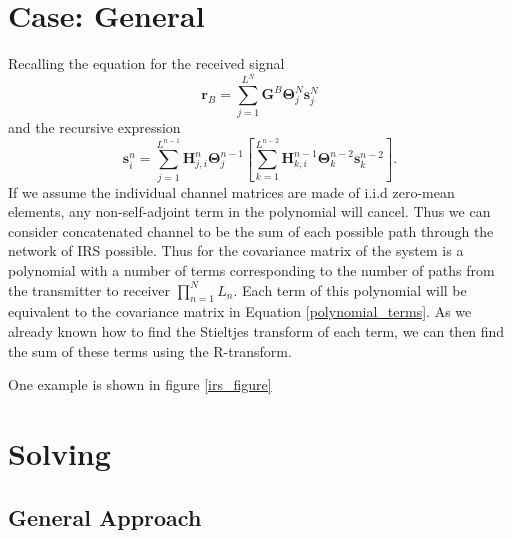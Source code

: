 \documentclass[12pt,a4paper]{report}
\begin{document}
\section{Case: General} 
Recalling the equation for the received signal
	\begin{equation*}
\mathbf{r}_{B} = \sum_{j = 1}^{L^{N}}\mathbf{G}^{B}\boldsymbol{\Theta}^{N}_{j}\mathbf{s}^{N}_{j}
\end{equation*}
and the recursive expression 
\begin{equation*}
\mathbf{s}^{n}_{i} = \sum_{j = 1}^{L^{n-1}}  \mathbf{H}^{n}_{j,i}\boldsymbol{\Theta}^{n-1}_{j} \left[
\sum_{k = 1}^{L^{n-2}}  \mathbf{H}^{n-1}_{k,i}\boldsymbol{\Theta}^{n-2}_{k}\mathbf{s}^{n-2}_{k} \right].
\end{equation*}
If we assume the individual channel matrices are made of i.i.d zero-mean elements, any non-self-adjoint term in the polynomial will cancel. Thus we can consider concatenated channel to be the sum of each possible path through the network of IRS possible. Thus for the covariance matrix of the system is a polynomial with a number of terms corresponding to the number of paths from the transmitter to receiver
$\prod_{n=1}^{N} L_n$. Each term of this polynomial will be equivalent to the covariance matrix in Equation \eqref{polynomial_terms}. As we already known how to find the Stieltjes transform of each term, we can then find the sum of these terms using the R-transform. 
\par
One example is shown in figure \ref{irs_figure}

\section{Solving } 
\subsection{General Approach } 
\end{document}
